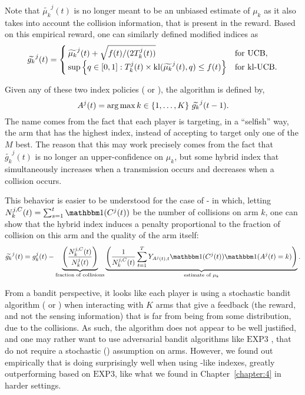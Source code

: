 Note that $\widetilde{\mu_k}^j(t)$ is no longer meant to be an unbiased estimate of $\mu_k$ as it also takes into account the collision information, that is present in the reward. Based on this empirical reward, one can similarly defined modified indices as
%
\begin{equation}\label{eq:5:indexTilde}
  \widetilde{g_k}^j(t) = \begin{cases}
      \widetilde{\mu_k}^j(t)  + \sqrt{  f(t) / (2T_k^j(t))}
      &\text{for } \mathrm{UCB}, \\
      \sup\left\{ q \in [0, 1]: T_k^j(t)\times \mathrm{kl}(\widetilde{\mu_k}^j(t), q) \leq f(t) \right\}
      &\text{for } \mathrm{kl}\text{-}\mathrm{UCB}.
  \end{cases}
\end{equation}

Given any of these two index policies (\UCB{} or \klUCB), the \Selfish{} algorithm is defined by,
%
\begin{equation}
  A^j(t) = \operatorname*{arg\,max}{ k \in \{1,\dots,K\}} \ \widetilde{g_k}^j(t-1).\label{algo:5:Selfish}
\end{equation}
The name comes from the fact that each player is targeting, in a ``selfish'' way, the arm that has the highest index, instead of accepting to target only one of the $M$ best.
The reason that this may work precisely comes from the fact that $\widetilde{g_k}^j(t)$ is no longer an upper-confidence on $\mu_k$,
but some hybrid index that simultaneously increases when a transmission occurs and decreases when a collision occurs.

This behavior is easier to be understood for the case of \Selfish-\UCB{} in which, letting $N_k^{j,C}(t) = \sum_{s=1}^t \indic(C^j(t))$ be the number of collisions on arm $k$, one can show that the hybrid \Selfish{} index induces a penalty proportional to the fraction of collision on this arm and the quality of the arm itself:
\begin{equation}
  \widetilde{g_k}^j(t) = g_k^j(t) -
  \underbrace{\left(\frac{N_k^{j,C}(t)}{N_k^j(t)}\right)}_{\text{fraction of collisions}}
  \underbrace{\left(\frac{1}{N_k^{j,C}(t)}\sum_{t=1}^{T}Y_{A^j(t),t} \indic(C^j(t)) \indic(A^j(t) = k)\right)}_{\text{estimate of } \mu_k }.
\end{equation}

From a bandit perspective, it looks like each player is using a stochastic bandit algorithm (\UCB{} or \klUCB) when interacting with $K$ arms that give a feedback (the reward, and not the sensing information) that is far from being \iid{} from some distribution, due to the collisions.
%
As such, the algorithm does not appear to be well justified, and one may rather want to use adversarial bandit algorithms like $\mathrm{EXP3}$ \citep{Auer02NonStochastic}, that do not require a stochastic (\iid) assumption on arms.
%
However, we found out empirically that \Selfish{} is doing surprisingly well when using \UCB-like indexes, greatly outperforming \Selfish{} based on $\mathrm{EXP3}$,
like what we found in Chapter~\ref{chapter:4} in harder settings.

